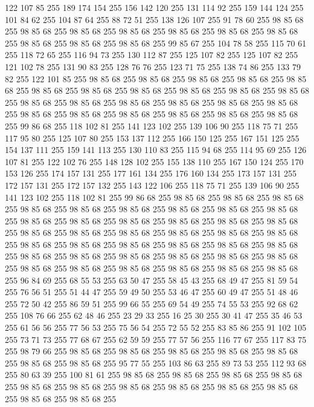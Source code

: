 122 107 85 255 189 174 154 255 156 142 120 255 131 114 92 255 159 144 124 255 101 84 62 255 104 87 64 255 88 72 51 255 138 126 107 255 91 78 60 255 98 85 68 255 98 85 68 255 98 85 68 255 98 85 68 255 98 85 68 255 98 85 68 255 98 85 68 255 98 85 68 255 98 85 68 255 98 85 68 255 99 85 67 255 104 78 58 255 115 70 61 255 118 72 65 255 116 94 73 255 130 112 87 255 125 107 82 255 125 107 82 255 121 102 78 255 131 90 83 255 128 76 76 255 123 71 75 255 138 74 86 255 133 79 82 255 122 101 85 255 98 85 68 255 98 85 68 255 98 85 68 255 98 85 68 255 98 85 68 255 98 85 68 255 98 85 68 255 98 85 68 255 98 85 68 255 98 85 68 255 98 85 68 255 98 85 68 255 98 85 68 255 98 85 68 255 98 85 68 255 98 85 68 255 98 85 68 255 98 85 68 255 98 85 68 255 98 85 68 255 98 85 68 255 98 85 68 255 98 85 68 255 99 86 68 255 118 102 81 255 141 123 102 255 139 106 90 255 118 75 71 255 117 95 80 255
125 107 80 255 153 137 112 255 166 150 125 255 167 151 125 255 154 137 111 255 159 141 113 255 130 110 83 255 115 94 68 255 114 95 69 255 126 107 81 255 122 102 76 255 148 128 102 255 155 138 110 255 167 150 124 255 170 153 126 255 174 157 131 255 177 161 134 255 176 160 134 255 173 157 131 255 172 157 131 255 172 157 132 255 143 122 106 255 118 75 71 255 139 106 90 255 141 123 102 255 118 102 81 255 99 86 68 255 98 85 68 255 98 85 68 255 98 85 68 255 98 85 68 255 98 85 68 255 98 85 68 255 98 85 68 255 98 85 68 255 98 85 68 255 98 85 68 255 98 85 68 255 98 85 68 255 98 85 68 255 98 85 68 255 98 85 68 255 98 85 68 255 98 85 68 255 98 85 68 255 98 85 68 255 98 85 68 255 98 85 68 255 98 85 68 255 98 85 68 255 98 85 68 255 98 85 68 255 98 85 68 255 98 85 68 255 98 85 68 255 98 85 68 255 98 85 68 255 98 85 68 255 98 85 68 255 98 85 68 255 98 85 68 255 98 85 68 255 98 85 68 255 98 85 68 255
98 85 68 255 98 85 68 255 96 84 69 255 68 55 53 255 63 50 47 255 58 45 43 255 68 49 47 255 81 59 54 255 76 56 51 255 51 44 47 255 59 49 50 255 53 46 47 255 60 49 47 255 51 48 46 255 72 50 42 255 86 59 51 255 99 66 55 255 69 54 49 255 74 55 53 255 92 68 62 255 108 76 66 255 62 48 46 255 23 29 33 255 16 25 30 255 30 41 47 255 35 46 53 255 61 56 56 255 77 56 53 255 75 56 54 255 72 55 52 255 83 85 86 255 91 102 105 255 73 71 73 255 77 68 67 255 62 59 59 255 77 57 56 255 116 77 67 255 117 83 75 255 98 79 66 255 98 85 68 255 98 85 68 255 98 85 68 255 98 85 68 255 98 85 68 255 98 85 68 255 98 85 68 255 95 77 55 255 103 86 63 255 89 73 53 255 112 93 68 255 80 63 39 255 100 81 61 255 98 85 68 255 98 85 68 255 98 85 68 255 98 85 68 255 98 85 68 255 98 85 68 255 98 85 68 255 98 85 68 255 98 85 68 255 98 85 68 255 98 85 68 255 98 85 68 255
